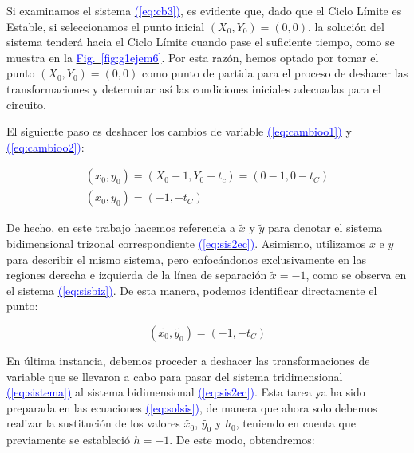\documentclass[12pt,a4paper]{report} %
\newcommand{\fref}[1]{\hyperref[#1]{\textcolor{blue}{Fig.~\ref*{#1}}}}
\newcommand{\eref}[1]{\hyperref[#1]{\textcolor{blue}{(\ref*{#1})}}}
\newcommand{\fref}[1]{\hyperref[#1]{\textcolor{blue}{\textit{Fig.~\ref*{#1}}}}}
\newcommand{\eref}[1]{\hyperref[#1]{\textcolor{blue}{\textit{(\ref*{#1})}}}}
\begin{document}
	\vspace{0.5cm}Si examinamos el sistema \eref{eq:cb3}, es evidente que, dado que el Ciclo Límite es Estable, si seleccionamos el punto inicial $(X_0, Y_0) = (0, 0)$, la solución del sistema tenderá hacia el Ciclo Límite cuando pase el suficiente tiempo, como se muestra en la \fref{fig:g1ejem6}. Por esta razón, hemos optado por tomar el punto $(X_0, Y_0) = (0, 0)$ como punto de partida para el proceso de deshacer las transformaciones y determinar así las condiciones iniciales adecuadas para el circuito.
	
	\vspace{0.5cm}\noindent El siguiente paso es deshacer los cambios de variable \eref{eq:cambioo1} y \eref{eq:cambioo2}:
	
	\begin{equation}
		\label{eq:desh1}
		\begin{gathered}
			(x_0,y_0)=\left( X_0-1,Y_0-t_c \right) = (0-1,0-t_C) \\[5mm]
			(x_0,y_0)=(-1,-t_C)
		\end{gathered}
	\end{equation}\smallskip
	
	De hecho, en este trabajo hacemos referencia a $\tilde{x}$ y $\tilde{y}$ para denotar el sistema bidimensional trizonal correspondiente \eref{eq:sis2ec}. Asimismo, utilizamos $x$ e $y$ para describir el mismo sistema, pero enfocándonos exclusivamente en las regiones derecha e izquierda de la línea de separación $\tilde{x}=-1$, como se observa en el sistema \eref{eq:sisbiz}. De esta manera, podemos identificar directamente el punto:	
	
	\begin{equation}
		\label{eq:desh2}
		(\tilde{x_0},\tilde{y_0}) = (-1,-t_C)
	\end{equation}\smallskip
	
	En última instancia, debemos proceder a deshacer las transformaciones de variable que se llevaron a cabo para pasar del sistema tridimensional \eref{eq:sistema} al sistema bidimensional \eref{eq:sis2ec}. Esta tarea ya ha sido preparada en las ecuaciones \eref{eq:solsis}, de manera que ahora solo debemos realizar la sustitución de los valores $\tilde{x_0}$, $\tilde{y_0}$ y $h_0$, teniendo en cuenta que previamente se estableció $h = -1$. De este modo, obtendremos:
	
\end{document}
